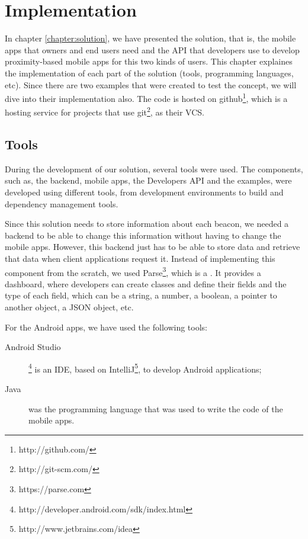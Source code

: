 
\chapter{Implementation}
\label{chapter:implementation}
In chapter \ref{chapter:solution}, we have presented the solution, that is,
the mobile apps that owners and end users need and the \gls{API} that developers use
to develop proximity-based mobile apps for this two kinds of users.
This chapter explaines the implementation of each part of the solution
(tools, programming languages, etc). Since there are two examples that were
created to test the concept, we will dive into their implementation also.
The code is hosted on
github\footnote{http://github.com/}, which is a hosting service for projects
that use git\footnote{http://git-scm.com/}, as their \gls{VCS}.

\section{Tools}
\label{sec:implementation_tools}
During the development of our solution, several tools were used.
The components, such as, the backend, mobile apps, the Developers \gls{API} and the examples, were developed using different tools, from development environments to build and dependency management tools.

Since this solution needs to store information about each beacon, we
needed a backend to be able to change this information without having
to change the mobile apps.
However, this backend just has to be able to store data and retrieve that
data when client applications request it.
Instead of implementing this component from the scratch, we used
Parse\footnote{https://parse.com}, which is a .
It provides a dashboard, where developers can create classes
and define their fields and the type of each field, which can be a string,
a number, a boolean, a pointer to another object, a \gls{JSON} object, etc.

For the Android apps, we have used the following tools:
\begin{description}
  \item[Android Studio] \footnote{http://developer.android.com/sdk/index.html} is an \gls{IDE}, based on IntelliJ\footnote{http://www.jetbrains.com/idea},
  to develop Android
  applications;
  \item[Java] was the programming language that was used to write the code of the mobile apps.
\end{description}

